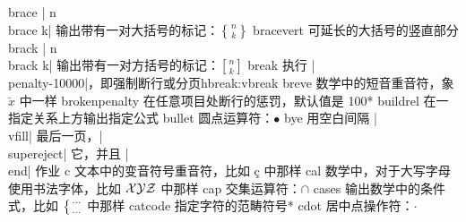 \capcs brace {| n\\brace k| 输出带有一对大括号的标记：$n \brace k$}{}{}
\capcs bracevert {可延长的大括号的竖直部分}{}{}
\capcs brack {| n\\brack k| 输出带有一对方括号的标记：$n \brack k$}{}{}
\capcstwo break {执行 |\\penalty-10000|，即强制断行或分页}{}{hbreak:vbreak}
\capcs breve {数学中的短音重音符，象 $\breve x$ 中一样}{}{}
\capcs brokenpenalty {在任意项目处断行的惩罚，默认值是 100}*{}%
\capcs buildrel {在一指定关系上方输出指定公式}{}{}
\capcs bullet {圆点运算符：$\bullet$}{}{}%
\capcs bye {用空白间隔 |\\vfill| 最后一页，|\\supereject| 它，并且 |\\end| 作业}{}{\@bye}
\capcs c {文本中的变音符号重音符，比如 \c c 中那样}{}{}%
\capcs cal {数学中，对于大写字母使用书法字体，比如 $\cal XYZ$ 中那样}{}{}
\capcs cap {交集运算符：$\cap$}{}{}
\capcs cases {输出数学中的条件式，比如 $\bigl\{{\cdots\atop\cdots}$ 中那样}{}{}
\capcs catcode {指定字符的范畴符号}*{}%
\capcs cdot {居中点操作符：$\cdot$}{}{}%
